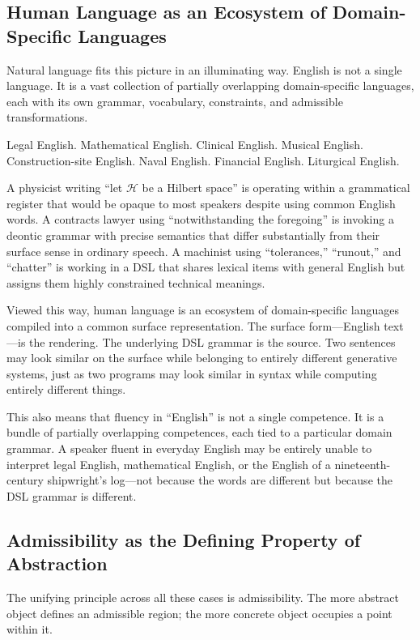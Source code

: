 \documentclass[12pt]{article}
\begin{document}
\subsection*{Human Language as an Ecosystem of Domain-Specific Languages}

Natural language fits this picture in an illuminating way. English is not a single language. It is a vast collection of partially overlapping domain-specific languages, each with its own grammar, vocabulary, constraints, and admissible transformations.

Legal English. Mathematical English. Clinical English. Musical English. Construction-site English. Naval English. Financial English. Liturgical English.

A physicist writing ``let $\mathcal{H}$ be a Hilbert space'' is operating within a grammatical register that would be opaque to most speakers despite using common English words. A contracts lawyer using ``notwithstanding the foregoing'' is invoking a deontic grammar with precise semantics that differ substantially from their surface sense in ordinary speech. A machinist using ``tolerances,'' ``runout,'' and ``chatter'' is working in a DSL that shares lexical items with general English but assigns them highly constrained technical meanings.

Viewed this way, human language is an ecosystem of domain-specific languages compiled into a common surface representation. The surface form---English text---is the rendering. The underlying DSL grammar is the source. Two sentences may look similar on the surface while belonging to entirely different generative systems, just as two programs may look similar in syntax while computing entirely different things.

This also means that fluency in ``English'' is not a single competence. It is a bundle of partially overlapping competences, each tied to a particular domain grammar. A speaker fluent in everyday English may be entirely unable to interpret legal English, mathematical English, or the English of a nineteenth-century shipwright's log---not because the words are different but because the DSL grammar is different.

\subsection*{Admissibility as the Defining Property of Abstraction}

The unifying principle across all these cases is admissibility. The more abstract object defines an admissible region; the more concrete object occupies a point within it.
\end{document}

